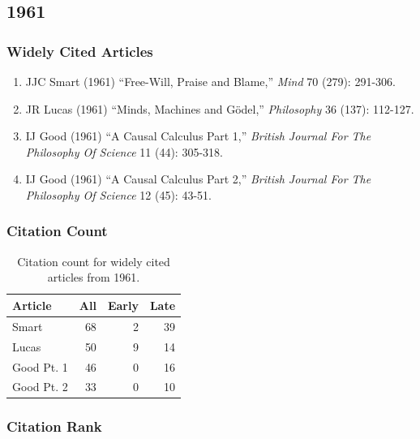 \documentclass[
  10pt,
  letterpaper,
  DIV=11,
  numbers=noendperiod,
  twoside]{scrartcl}
\providecommand{\tightlist}{%
  \setlength{\itemsep}{0pt}\setlength{\parskip}{0pt}}\usepackage{longtable,booktabs,array}
\begin{document}
\newpage

\subsection{1961}\label{sec-s1961}

\subsubsection*{Widely Cited Articles}\label{widely-cited-articles-5}

\begin{enumerate}
\def\labelenumi{\arabic{enumi}.}
\tightlist
\item
  JJC Smart (1961) ``Free-Will, Praise and Blame,'' \emph{Mind} 70
  (279): 291-306.
\item
  JR Lucas (1961) ``Minds, Machines and Gödel,'' \emph{Philosophy} 36
  (137): 112-127.
\item
  IJ Good (1961) ``A Causal Calculus Part 1,'' \emph{British Journal For
  The Philosophy Of Science} 11 (44): 305-318.
\item
  IJ Good (1961) ``A Causal Calculus Part 2,'' \emph{British Journal For
  The Philosophy Of Science} 12 (45): 43-51.
\end{enumerate}

\subsubsection*{Citation Count}\label{sec-count-1961}

\begin{longtable}[]{@{}lrrr@{}}

\caption{\label{tbl-citation-count-1961}Citation count for widely cited
articles from 1961.}

\tabularnewline

\toprule\noalign{}
Article & All & Early & Late \\
\midrule\noalign{}
\endhead
\bottomrule\noalign{}
\endlastfoot
Smart & 68 & 2 & 39 \\
Lucas & 50 & 9 & 14 \\
Good Pt. 1 & 46 & 0 & 16 \\
Good Pt. 2 & 33 & 0 & 10 \\

\end{longtable}

\subsubsection*{Citation Rank}\label{sec-rank-1961}
\end{document}
